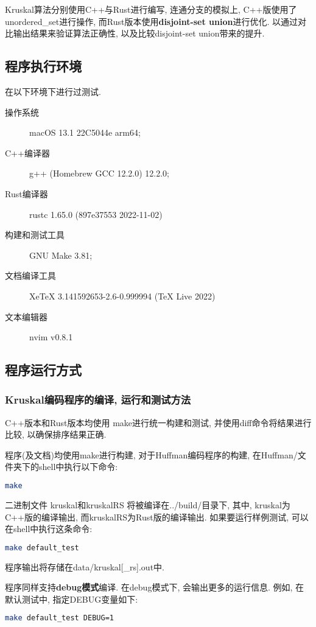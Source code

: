 Kruskal算法分别使用C++与Rust进行编写, 连通分支的模拟上,
C++版使用了unordered_set进行操作, 而Rust版本使用\textbf{disjoint-set
	union}进行优化. 以通过对比输出结果来验证算法正确性, 以及比较disjoint-set
union带来的提升.

\subsection{程序执行环境}
在以下环境下进行过测试.

\begin{description}
	\item[操作系统] macOS 13.1 22C5044e arm64;
	\item[C++编译器] g++ (Homebrew GCC 12.2.0) 12.2.0;
	\item[Rust编译器] rustc 1.65.0 (897e37553 2022-11-02)
	\item[构建和测试工具] GNU Make 3.81;
	\item[文档编译工具] XeTeX 3.141592653-2.6-0.999994 (TeX Live 2022)
	\item[文本编辑器] nvim v0.8.1
\end{description}

\subsection{程序运行方式}
\subsubsection{Kruskal编码程序的编译, 运行和测试方法}
C++版本和Rust版本均使用 make进行统一构建和测试, 并使用diff命令将结果进行比较,
以确保排序结果正确.\par

程序(及文档)均使用make进行构建, 对于Huffman编码程序的构建, 在Huffman/文件夹下的shell中执行以下命令:
\begin{lstlisting}[language=bash]
make
\end{lstlisting}
二进制文件 kruskal和kruskalRS 将被编译在../build/目录下, 其中,
kruskal为C++版的编译输出, 而kruskalRS为Rust版的编译输出.
如果要运行样例测试, 可以在shell中执行这条命令:

\begin{lstlisting}[language=bash]
make default_test
\end{lstlisting}
程序输出将存储在data/kruskal[\_rs].out中.\par

程序同样支持\textbf{debug模式}编译. 在debug模式下, 会输出更多的运行信息.
例如, 在默认测试中, 指定DEBUG变量如下:
\begin{lstlisting}[language=bash]
make default_test DEBUG=1
\end{lstlisting}

